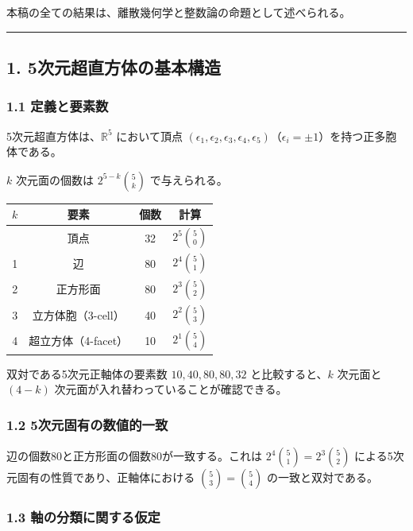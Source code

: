 \documentclass[a4paper,11pt]{ltjsarticle}
\newcounter{none}
\begin{document}
本稿の全ての結果は、離散幾何学と整数論の命題として述べられる。

\begin{center}\rule{0.5\linewidth}{0.5pt}\end{center}

\subsection*{1. 5次元超直方体の基本構造}

\subsubsection*{1.1 定義と要素数}

5次元超直方体は、$\mathbb{R}^5$ において頂点
$(\epsilon_1, \epsilon_2, \epsilon_3, \epsilon_4, \epsilon_5)$（$\epsilon_i = \pm 1$）を持つ正多胞体である。

$k$ 次元面の個数は $2^{5-k}\binom{5}{k}$ で与えられる。

{\def\LTcaptype{none}
\begin{longtable}[]{@{}cccc@{}}
\toprule
$k$ & 要素 & 個数 & 計算 \\
\midrule
\endhead
\bottomrule
\endlastfoot
0 & 頂点 & 32 & $2^5 \binom{5}{0}$ \\
1 & 辺 & 80 & $2^4 \binom{5}{1}$ \\
2 & 正方形面 & 80 & $2^3 \binom{5}{2}$ \\
3 & 立方体胞（3-cell） & 40 & $2^2 \binom{5}{3}$ \\
4 & 超立方体（4-facet） & 10 & $2^1 \binom{5}{4}$ \\
\end{longtable}
}

双対である5次元正軸体の要素数 $10, 40, 80, 80, 32$ と比較すると、$k$ 次元面と $(4-k)$ 次元面が入れ替わっていることが確認できる。

\subsubsection*{1.2 5次元固有の数値的一致}

辺の個数80と正方形面の個数80が一致する。これは $2^4 \binom{5}{1} = 2^3 \binom{5}{2}$ による5次元固有の性質であり、正軸体における $\binom{5}{3} = \binom{5}{4}$ の一致と双対である。

\subsubsection*{1.3 軸の分類に関する仮定}
\end{document}
